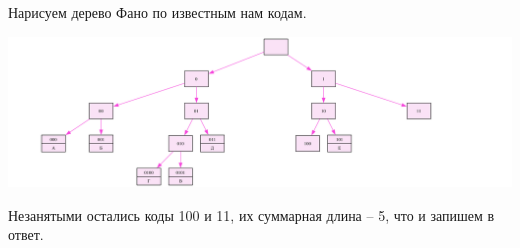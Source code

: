 \documentclass[14pt,a4paper]{article}
\begin{document}
Нарисуем дерево Фано по известным нам кодам.

\begin{center}
    \includegraphics[width=1.0\textwidth]{tree.png}
\end{center}

Незанятыми остались коды 100 и 11, их суммарная длина -- 5, что и
запишем в ответ.
\end{document}
